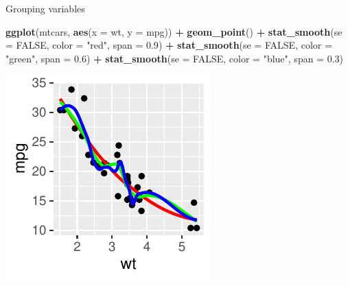 \documentclass[
  ignorenonframetext,
]{beamer}
\newenvironment{Shaded}{\begin{snugshade}}{\end{snugshade}}
\newcommand{\AttributeTok}[1]{\textcolor[rgb]{0.13,0.29,0.53}{#1}}
\newcommand{\ConstantTok}[1]{\textcolor[rgb]{0.56,0.35,0.01}{#1}}
\newcommand{\FloatTok}[1]{\textcolor[rgb]{0.00,0.00,0.81}{#1}}
\newcommand{\FunctionTok}[1]{\textcolor[rgb]{0.13,0.29,0.53}{\textbf{#1}}}
\newcommand{\NormalTok}[1]{#1}
\newcommand{\SpecialCharTok}[1]{\textcolor[rgb]{0.81,0.36,0.00}{\textbf{#1}}}
\newcommand{\StringTok}[1]{\textcolor[rgb]{0.31,0.60,0.02}{#1}}
\begin{document}
\begin{frame}[fragile]{Grouping variables}
\label{grouping-variables-8}

\begin{Shaded}
\begin{Highlighting}[]
\FunctionTok{ggplot}\NormalTok{(mtcars, }\FunctionTok{aes}\NormalTok{(}\AttributeTok{x =}\NormalTok{ wt, }\AttributeTok{y =}\NormalTok{ mpg)) }\SpecialCharTok{+} \FunctionTok{geom\_point}\NormalTok{() }\SpecialCharTok{+} \FunctionTok{stat\_smooth}\NormalTok{(}\AttributeTok{se =} \ConstantTok{FALSE}\NormalTok{,}
    \AttributeTok{color =} \StringTok{"red"}\NormalTok{, }\AttributeTok{span =} \FloatTok{0.9}\NormalTok{) }\SpecialCharTok{+} \FunctionTok{stat\_smooth}\NormalTok{(}\AttributeTok{se =} \ConstantTok{FALSE}\NormalTok{, }\AttributeTok{color =} \StringTok{"green"}\NormalTok{,}
    \AttributeTok{span =} \FloatTok{0.6}\NormalTok{) }\SpecialCharTok{+} \FunctionTok{stat\_smooth}\NormalTok{(}\AttributeTok{se =} \ConstantTok{FALSE}\NormalTok{, }\AttributeTok{color =} \StringTok{"blue"}\NormalTok{, }\AttributeTok{span =} \FloatTok{0.3}\NormalTok{)}
\end{Highlighting}
\end{Shaded}

\begin{center}\includegraphics[width=0.5\linewidth]{Figs/unnamed-chunk-10-1} \end{center}
\end{frame}
\end{document}
